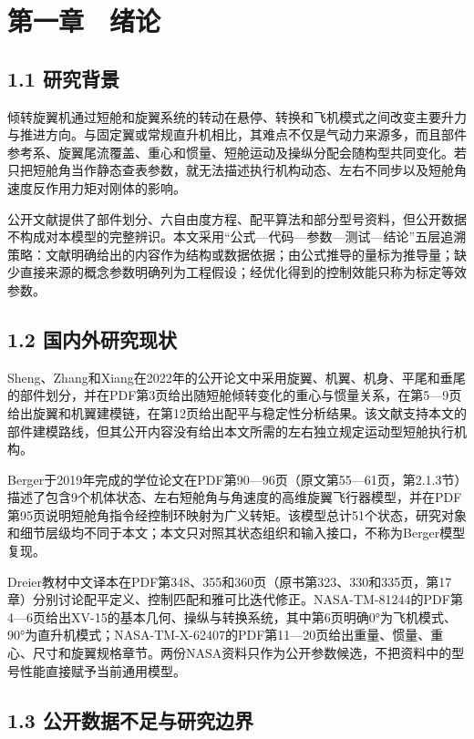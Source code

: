 \documentclass[UTF8,12pt,openany]{ctexbook}
\begin{document}
\chapter{第一章　绪论}

\section{1.1 研究背景}

倾转旋翼机通过短舱和旋翼系统的转动在悬停、转换和飞机模式之间改变主要升力与推进方向。与固定翼或常规直升机相比，其难点不仅是气动力来源多，而且部件参考系、旋翼尾流覆盖、重心和惯量、短舱运动及操纵分配会随构型共同变化。若只把短舱角当作静态查表参数，就无法描述执行机构动态、左右不同步以及短舱角速度反作用力矩对刚体的影响。

公开文献提供了部件划分、六自由度方程、配平算法和部分型号资料，但公开数据不构成对本模型的完整辨识。本文采用“公式—代码—参数—测试—结论”五层追溯策略：文献明确给出的内容作为结构或数据依据；由公式推导的量标为推导量；缺少直接来源的概念参数明确列为工程假设；经优化得到的控制效能只称为标定等效参数。

\section{1.2 国内外研究现状}

Sheng、Zhang和Xiang在2022年的公开论文中采用旋翼、机翼、机身、平尾和垂尾的部件划分，并在PDF第3页给出随短舱倾转变化的重心与惯量关系，在第5—9页给出旋翼和机翼建模链，在第12页给出配平与稳定性分析结果。该文献支持本文的部件建模路线，但其公开内容没有给出本文所需的左右独立规定运动型短舱执行机构。

Berger于2019年完成的学位论文在PDF第90—96页（原文第55—61页，第2.1.3节）描述了包含9个机体状态、左右短舱角与角速度的高维旋翼飞行器模型，并在PDF第95页说明短舱角指令经控制环映射为广义转矩。该模型总计51个状态，研究对象和细节层级均不同于本文；本文只对照其状态组织和输入接口，不称为Berger模型复现。

Dreier教材中文译本在PDF第348、355和360页（原书第323、330和335页，第17章）分别讨论配平定义、控制匹配和雅可比迭代修正。NASA-TM-81244的PDF第4—6页给出XV-15的基本几何、操纵与转换系统，其中第6页明确0°为飞机模式、90°为直升机模式；NASA-TM-X-62407的PDF第11—20页给出重量、惯量、重心、尺寸和旋翼规格章节。两份NASA资料只作为公开参数候选，不把资料中的型号性能直接赋予当前通用模型。

\section{1.3 公开数据不足与研究边界}
\end{document}
